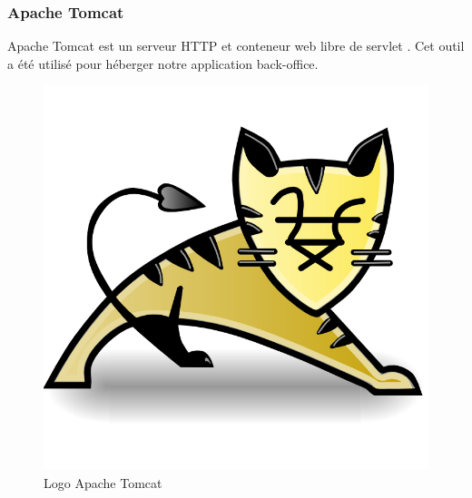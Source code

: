 \subsubsection{Apache Tomcat}
\noindent\begin{minipage}{0.69\textwidth}
Apache Tomcat est un serveur HTTP et conteneur web libre de servlet \cite{Tomcat}. Cet outil a été utilisé pour héberger notre application back-office.
\end{minipage}
\begin{minipage}{0.3\textwidth}
\begin{figure}[H]
  \centering
  \includegraphics[scale=0.17]{figures/logo/tomcat.png}
  \caption{Logo Apache Tomcat}
  \label{code33}
\end{figure}
\end{minipage}
